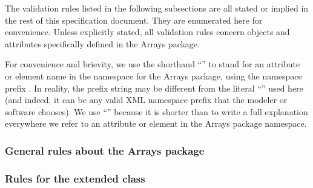 The validation rules listed in the following subsections are all stated
or implied in the rest of this specification document.  They are
enumerated here for convenience.  Unless explicitly stated, all
validation rules concern objects and attributes specifically defined in
the Arrays package.

For \notice convenience and brievity, we use the shorthand
``'' to stand for an attribute or element name 
in the namespace for the Arrays package, using
the namespace prefix .  In reality, the prefix string may be
different from the literal ``'' used here (and indeed, it
can be any valid XML namespace prefix that the modeler or software
chooses).  We use ``'' because it is shorter than to
write a full explanation everywhere we refer to an attribute or element
in the Arrays package namespace.

\subsubsection*{General rules about the Arrays package}
\setcounter{arraysCtr}{10101} 
  

\subsubsection*{Rules for the extended  class} 
\setcounter{arraysCtr}{10201}

  
